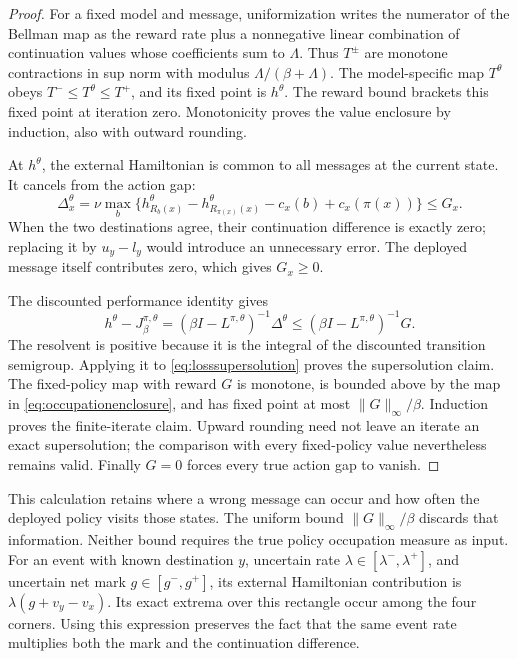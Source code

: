 \documentclass[11pt]{article}
\theoremstyle{plain}
\theoremstyle{definition}
\theoremstyle{remark}
\begin{document}
\begin{proof}
For a fixed model and message, uniformization writes the numerator
of the Bellman map as the reward rate plus a nonnegative linear
combination of continuation values whose coefficients sum to
\(\Lambda\). Thus \(T^\pm\) are monotone contractions in sup norm
with modulus \(\Lambda/(\beta+\Lambda)\). The model-specific map
\(T^\theta\) obeys \(T^-\le T^\theta\le T^+\), and its fixed point
is \(h^\theta\). The reward bound brackets this fixed point at
iteration zero. Monotonicity proves the value enclosure by induction,
also with outward rounding.

At \(h^\theta\), the external Hamiltonian is common to all
messages at the current state. It cancels from the action gap:
\[
 \Delta_x^\theta
 =\nu\max_b\{h^\theta_{R_b(x)}
             -h^\theta_{R_{\pi(x)}(x)}
             -c_x(b)+c_x(\pi(x))\}\le G_x .
\]
When the two destinations agree, their continuation difference is
exactly zero; replacing it by \(u_y-l_y\) would introduce an
unnecessary error. The deployed message itself contributes zero,
which gives \(G_x\ge0\).

The discounted performance identity gives
\[
 h^\theta-J_\beta^{\pi,\theta}
 =(\beta I-L^{\pi,\theta})^{-1}\Delta^\theta
 \le(\beta I-L^{\pi,\theta})^{-1}G.
\]
The resolvent is positive because it is the integral of the
discounted transition semigroup. Applying it to
\eqref{eq:losssupersolution} proves the supersolution claim.
The fixed-policy map with reward \(G\) is monotone, is bounded
above by the map in \eqref{eq:occupationenclosure}, and has fixed
point at most \(\|G\|_\infty/\beta\). Induction proves the
finite-iterate claim. Upward rounding need not leave an iterate
an exact supersolution; the comparison with every fixed-policy
value nevertheless remains valid. Finally \(G=0\) forces every
true action gap to vanish.
\end{proof}

This calculation retains where a wrong message can occur and how
often the deployed policy visits those states. The uniform bound
\(\|G\|_\infty/\beta\) discards that information. Neither bound
requires the true policy occupation measure as input.
For an event with known destination \(y\), uncertain rate
\(\lambda\in[\lambda^-,\lambda^+]\), and uncertain net mark
\(g\in[g^-,g^+]\), its external Hamiltonian contribution is
\(\lambda(g+v_y-v_x)\). Its exact extrema over this rectangle
occur among the four corners. Using this expression preserves
the fact that the same event rate multiplies both the mark and
the continuation difference.
\end{document}
